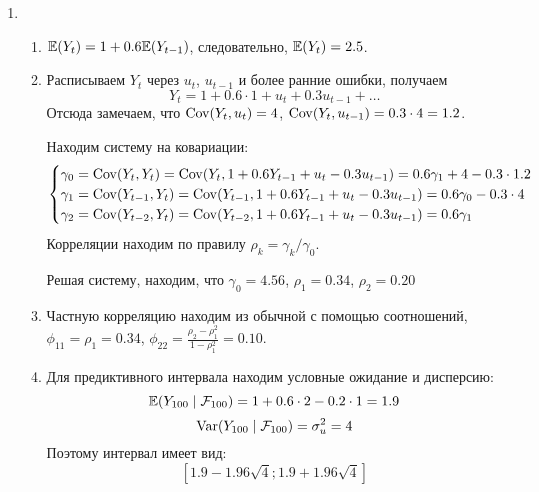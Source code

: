 \begin{enumerate}
  \item 
  \begin{enumerate}
    \item $\mathbb{E}(Y_t) = 1 + 0.6 \mathbb{E}(Y_{t-1})$, следовательно, $\mathbb{E}(Y_t) = 2.5$.
    \item Расписываем $Y_t$ через $u_t$, $u_{t-1}$ и более ранние ошибки, получаем
    \[
    Y_t = 1 + 0.6 \cdot 1 + u_t + 0.3 u_{t-1} + \ldots  
    \]
    Отсюда замечаем, что $\operatorname{Cov}(Y_t, u_t) = 4$, $\operatorname{Cov}(Y_t, u_{t-1}) = 0.3\cdot 4 = 1.2$.
    
    Находим систему на ковариации:
    \[
    \begin{cases}
      \gamma_0 = \operatorname{Cov}(Y_t, Y_t) = \operatorname{Cov}(Y_t, 1 + 0.6Y_{t-1} + u_t - 0.3 u_{t-1}) = 0.6\gamma_1 + 4 - 0.3\cdot 1.2 \\
      \gamma_1 = \operatorname{Cov}(Y_{t-1}, Y_t) = \operatorname{Cov}(Y_{t-1}, 1 + 0.6Y_{t-1} + u_t - 0.3 u_{t-1}) = 0.6\gamma_0 - 0.3 \cdot 4 \\
      \gamma_2 = \operatorname{Cov}(Y_{t-2}, Y_t) = \operatorname{Cov}(Y_{t-2}, 1 + 0.6Y_{t-1} + u_t - 0.3 u_{t-1}) = 0.6\gamma_1 \\
    \end{cases}
    \]
    Корреляции находим по правилу $\rho_k = \gamma_k / \gamma_0$.

    Решая систему, находим, что $\gamma_0 = 4.56$, $\rho_1 = 0.34$, $\rho_2 = 0.20$

    \item Частную корреляцию находим из обычной с помощью соотношений, $\phi_{11} = \rho_1 = 0.34$, 
    $\phi_{22} = \frac{\rho_2 - \rho_1^2}{1-\rho_1^2} = 0.10$.
    \item Для предиктивного интервала находим условные ожидание и дисперсию: 
    \[
    \mathbb{E}(Y_{100} \mid \mathcal{F}_{100}) = 1 + 0.6 \cdot 2 - 0.2 \cdot 1 = 1.9
    \]
    \[
    \operatorname{Var}(Y_{100} \mid \mathcal{F}_{100}) = \sigma^2_{u} = 4
    \]
    Поэтому интервал имеет вид:
    \[
    [1.9 - 1.96 \sqrt{4} ; 1.9 + 1.96 \sqrt{4}]  
    \]
  \end{enumerate}
  
  
\end{enumerate}